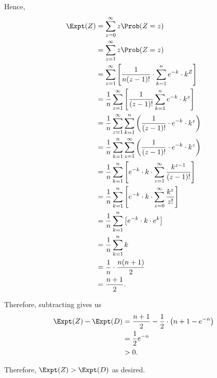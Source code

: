 \begin{enumerate}
\begin{enumerate}
                    Hence,
                    \begin{align*}
                        \Expt(Z) & = \sum_{z = 0}^{\infty} z \Prob(Z = z)                                                                            \\
                                 & = \sum_{z = 1}^{\infty} z \Prob(Z = z)                                                                            \\
                                 & = \sum_{z = 1}^{\infty} \left[\frac{1}{n (z - 1)!} \cdot \sum_{k = 1}^{n} e^{-k} \cdot k^Z\right]                 \\
                                 & = \frac{1}{n} \sum_{z = 1}^{\infty} \left[\frac{1}{(z - 1)!} \sum_{k = 1}^{n} e^{-k} \cdot k^z\right]             \\
                                 & = \frac{1}{n} \sum_{z = 1}^{\infty} \sum_{k = 1}^{n} \left(\frac{1}{(z - 1)!} \cdot e^{-k} \cdot k^z\right)       \\
                                 & = \frac{1}{n} \sum_{k = 1}^{n} \sum_{z = 1}^{\infty} \left(\frac{1}{(z - 1)!} \cdot e^{-k} \cdot k^z\right)       \\
                                 & = \frac{1}{n} \sum_{k = 1}^{n} \left[e^{-k} \cdot k \cdot \sum_{z = 1}^{\infty} \frac{k^{z - 1}}{(z - 1)!}\right] \\
                                 & = \frac{1}{n} \sum_{k = 1}^{n} \left[e^{-k} \cdot k \cdot \sum_{z = 0}^{\infty} \frac{k^z}{z!}\right]             \\
                                 & = \frac{1}{n} \sum_{k = 1}^{n} \left[e^{-k} \cdot k \cdot e^{k}\right]                                            \\
                                 & = \frac{1}{n} \sum_{k = 1}^{n} k                                                                                  \\
                                 & = \frac{1}{n} \cdot \frac{n (n + 1)}{2}                                                                           \\
                                 & = \frac{n + 1}{2}.
                    \end{align*}

                    Therefore, subtracting gives us
                    \begin{align*}
                        \Expt(Z) - \Expt(D) & = \frac{n + 1}{2} - \frac{1}{2} \cdot \left(n + 1 - e^{-n}\right) \\
                                            & = \frac{1}{2} e^{-n}                                              \\
                                            & > 0.
                    \end{align*}

                    Therefore, \(\Expt(Z) > \Expt(D)\) as desired.
          \end{enumerate}
\end{enumerate}